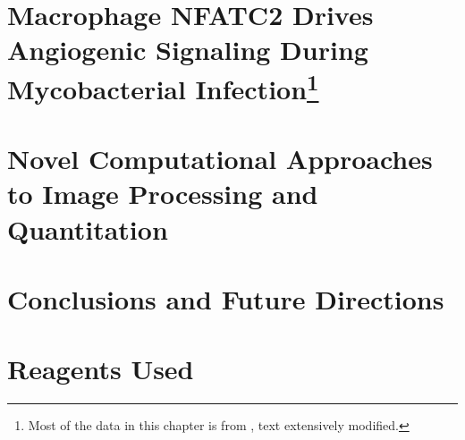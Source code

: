 \documentclass[PhD]{dukethesis2006}
\begin{document}
\chapter[Macrophage NFATC2 Drives Angiogenic Signaling During Mycobacterial Infection]{Macrophage NFATC2 Drives Angiogenic Signaling During Mycobacterial Infection\footnote{Most of the data in this chapter is from , text extensively modified.}}\label{chap3}

\begin{doublespace}

\end{doublespace}

\chapter{Novel Computational Approaches to Image Processing and Quantitation}\label{chap4}

\begin{doublespace}

\end{doublespace}

\chapter{Conclusions and Future Directions}\label{conclusions}

\begin{doublespace}

\end{doublespace}

\appendix

\chapter{Reagents Used}\label{reagents}

\begin{doublespace}

\end{doublespace}

%
%
\end{document}
